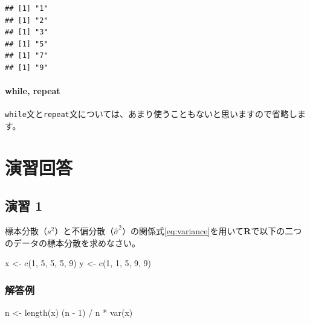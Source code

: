 \documentclass[
  12pt,
]{book}
\newenvironment{Shaded}{\begin{snugshade}}{\end{snugshade}}
\newcommand{\DecValTok}[1]{\textcolor[rgb]{0.00,0.00,0.81}{#1}}
\newcommand{\FunctionTok}[1]{\textcolor[rgb]{0.00,0.00,0.00}{#1}}
\newcommand{\NormalTok}[1]{#1}
\newcommand{\OtherTok}[1]{\textcolor[rgb]{0.56,0.35,0.01}{#1}}
\newcommand{\SpecialCharTok}[1]{\textcolor[rgb]{0.00,0.00,0.00}{#1}}
\begin{document}
\begin{verbatim}
## [1] "1"
## [1] "2"
## [1] "3"
## [1] "5"
## [1] "7"
## [1] "9"
\end{verbatim}

\hypertarget{while-repeat}{%
\subsubsection{while, repeat}\label{while-repeat}}

\texttt{while}文と\texttt{repeat}文については、あまり使うこともないと思いますので省略します。

\hypertarget{ux6f14ux7fd2ux56deux7b54}{%
\chapter{演習回答}\label{ux6f14ux7fd2ux56deux7b54}}

\hypertarget{ux6f14ux7fd2-1-1}{%
\section*{演習 1}\label{ux6f14ux7fd2-1-1}}

標本分散（\(s^2\)）と不偏分散（\(\hat{\sigma}^2\)）の関係式\eqref{eq:variance}を用いて\textbf{R}で以下の二つのデータの標本分散を求めなさい。

\begin{Shaded}
\begin{Highlighting}[]
\NormalTok{x }\OtherTok{\textless{}{-}} \FunctionTok{c}\NormalTok{(}\DecValTok{1}\NormalTok{, }\DecValTok{5}\NormalTok{, }\DecValTok{5}\NormalTok{, }\DecValTok{5}\NormalTok{, }\DecValTok{9}\NormalTok{)}
\NormalTok{y }\OtherTok{\textless{}{-}} \FunctionTok{c}\NormalTok{(}\DecValTok{1}\NormalTok{, }\DecValTok{1}\NormalTok{, }\DecValTok{5}\NormalTok{, }\DecValTok{9}\NormalTok{, }\DecValTok{9}\NormalTok{)}
\end{Highlighting}
\end{Shaded}

\hypertarget{ux89e3ux7b54ux4f8b}{%
\subsection*{解答例}\label{ux89e3ux7b54ux4f8b}}

\begin{Shaded}
\begin{Highlighting}[]
\NormalTok{n }\OtherTok{\textless{}{-}} \FunctionTok{length}\NormalTok{(x)}
\NormalTok{(n }\SpecialCharTok{{-}} \DecValTok{1}\NormalTok{) }\SpecialCharTok{/}\NormalTok{ n }\SpecialCharTok{*} \FunctionTok{var}\NormalTok{(x)}
\end{Highlighting}
\end{Shaded}
\end{document}
